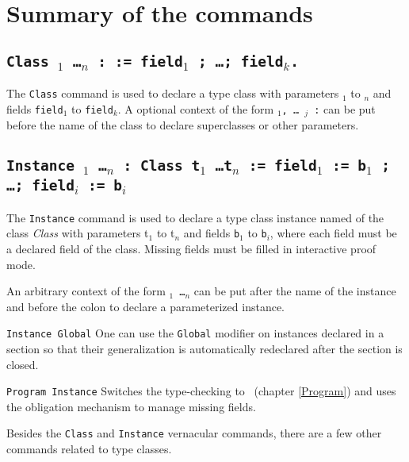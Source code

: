 \section{Summary of the commands
\label{TypeClassCommands}}

\subsection{\tt Class {\ident} {\binder$_1$ \ldots \binder$_n$} 
  : \sort := field$_1$ ; \ldots ; field$_k$.}
\label{Class}

The \texttt{Class} command is used to declare a type class with
parameters {\binder$_1$} to {\binder$_n$} and fields {\tt field$_1$} to
{\tt field$_k$}. A optional context of the form {\tt \binder$_1$, \ldots
  \binder$_j$ :} can be put before the name of the class to declare
superclasses or other parameters.

\subsection{\tt Instance {\ident} {\binder$_1$ \ldots \binder$_n$} : {Class} {t$_1$ \ldots t$_n$}
  := field$_1$ := b$_1$ ; \ldots ; field$_i$ := b$_i$}
\label{Instance}

The \texttt{Instance} command is used to declare a type class instance
named {\ident} of the class \emph{Class} with parameters {t$_1$} to {t$_n$} and
fields {\tt b$_1$} to {\tt b$_i$}, where each field must be a declared
field of the class. Missing fields must be filled in interactive proof mode.

An arbitrary context of the form {\tt \binder$_1$ \ldots \binder$_n$}
can be put after the name of the instance and before the colon to declare a parameterized instance.

\begin{Variants}
\item {\tt Instance Global} One can use the \texttt{Global} modifier on
  instances declared in a section so that their generalization is automatically
  redeclared after the section is closed.

\item {\tt Program Instance} 
  Switches the type-checking to \Program~(chapter \ref{Program})
  and uses the obligation mechanism to manage missing fields.
\end{Variants}

Besides the {\tt Class} and {\tt Instance} vernacular commands, there
are a few other commands related to type classes.

